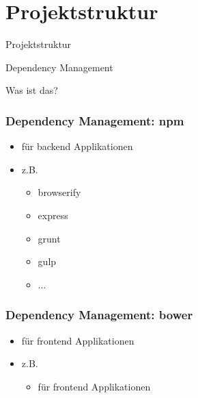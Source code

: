 \documentclass{beamer}
\begin{document}

\section{Projektstruktur}

\begin{frame}
\Huge{
\centerline{Projektstruktur}
}
\end{frame}


\begin{frame}
\Huge{
\centerline{Dependency Management}
\centerline{{\small Was ist das?}}
}
\end{frame}


\begin{frame}
\frametitle{Dependency Management: npm}
\begin{itemize}
\item für backend Applikationen
\item z.B.
\begin{itemize}
\item browserify
\item express
\item grunt
\item gulp
\item ...
\end{itemize}
\end{itemize}
\end{frame}


\begin{frame}
\frametitle{Dependency Management: bower}
\begin{itemize}
\item für frontend Applikationen
\item z.B.
\begin{itemize}
\item für frontend Applikationen
\end{itemize}
\end{itemize}
\end{frame}





\end{document}
